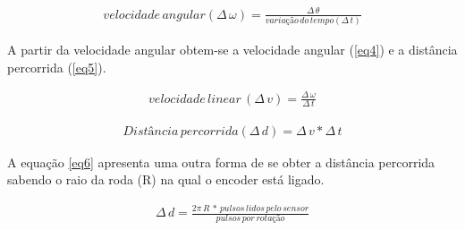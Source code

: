 \begin{enumerate}
          \begin{eqnarray} 
            \label{eq3}
            velocidade\,angular (\Delta\,\omega)= \frac{\Delta\,\theta}{variação\,do\,tempo (\Delta\,t)} 
          \end{eqnarray}

          A partir da velocidade angular obtem-se a velocidade angular (\ref{eq4}) e a distância percorrida (\ref{eq5}).

          \begin{eqnarray} 
            \label{eq4}
            velocidade\,linear\,(\Delta\,v) =\frac{\Delta\,\omega}{\Delta\,t}
          \end{eqnarray}    
          
          \begin{eqnarray} 
            \label{eq5}
            Distância\,percorrida(\Delta\,d)=\Delta\,v *\Delta\,t
          \end{eqnarray}

          A equação \ref{eq6} apresenta uma outra forma de se obter a distância percorrida sabendo o raio da roda (R) na qual o encoder está ligado.

          \begin{eqnarray} 
            \label{eq6}
            \Delta\,d=\frac{2\pi\,R\,*\,pulsos\,lidos\,pelo\,sensor}{pulsos\,por\,rotação} 
          \end{eqnarray}




			\end{enumerate}



